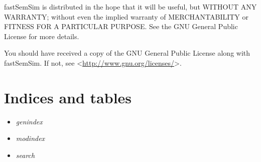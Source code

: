 \documentclass[letterpaper,10pt,english]{sphinxmanual}
\begin{document}
fastSemSim is distributed in the hope that it will be useful,
but WITHOUT ANY WARRANTY; without even the implied warranty of
MERCHANTABILITY or FITNESS FOR A PARTICULAR PURPOSE.  See the
GNU General Public License for more details.

You should have received a copy of the GNU General Public License
along with fastSemSim.  If not, see \textless{}\href{http://www.gnu.org/licenses/}{http://www.gnu.org/licenses/}\textgreater{}.


\chapter{Indices and tables}
\label{index:indices-and-tables}\begin{itemize}
\item {} 
\emph{genindex}

\item {} 
\emph{modindex}

\item {} 
\emph{search}

\end{itemize}
\end{document}
